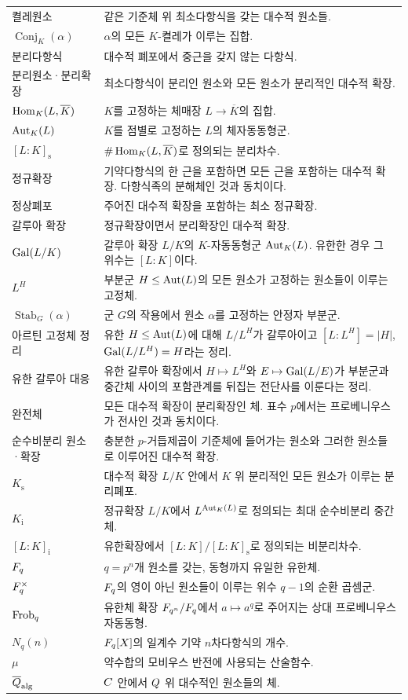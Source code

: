 \begin{longtable}{>{\raggedright\arraybackslash}p{}>{\raggedright\arraybackslash}p{}}
켤레원소 & 같은 기준체 위 최소다항식을 갖는 대수적 원소들. \\
$\operatorname{Conj}_K(\alpha)$ & $\alpha$의 모든 $K$-켤레가 이루는 집합. \\
분리다항식 & 대수적 폐포에서 중근을 갖지 않는 다항식. \\
분리원소·분리확장 & 최소다항식이 분리인 원소와 모든 원소가 분리적인 대수적 확장. \\
$\operatorname{Hom}_K(L,\overline K)$ & $K$를 고정하는 체매장 $L\to\overline K$의 집합. \\
$\operatorname{Aut}_K(L)$ & $K$를 점별로 고정하는 $L$의 체자동동형군. \\
$[L:K]_{\mathrm s}$ & $\#\operatorname{Hom}_K(L,\overline K)$로 정의되는 분리차수. \\
정규확장 & 기약다항식의 한 근을 포함하면 모든 근을 포함하는 대수적 확장. 다항식족의 분해체인 것과 동치이다. \\
정상폐포 & 주어진 대수적 확장을 포함하는 최소 정규확장. \\
갈루아 확장 & 정규확장이면서 분리확장인 대수적 확장. \\
$\operatorname{Gal}(L/K)$ & 갈루아 확장 $L/K$의 $K$-자동동형군 $\operatorname{Aut}_K(L)$. 유한한 경우 그 위수는 $[L:K]$이다. \\
$L^H$ & 부분군 $H\le\operatorname{Aut}(L)$의 모든 원소가 고정하는 원소들이 이루는 고정체. \\
$\operatorname{Stab}_G(\alpha)$ & 군 $G$의 작용에서 원소 $\alpha$를 고정하는 안정자 부분군. \\
아르틴 고정체 정리 & 유한 $H\le\operatorname{Aut}(L)$에 대해 $L/L^H$가 갈루아이고 $[L:L^H]=|H|$, $\operatorname{Gal}(L/L^H)=H$라는 정리. \\
유한 갈루아 대응 & 유한 갈루아 확장에서 $H\mapsto L^H$와 $E\mapsto\operatorname{Gal}(L/E)$가 부분군과 중간체 사이의 포함관계를 뒤집는 전단사를 이룬다는 정리. \\
완전체 & 모든 대수적 확장이 분리확장인 체. 표수 $p$에서는 프로베니우스가 전사인 것과 동치이다. \\
순수비분리 원소·확장 & 충분한 $p$-거듭제곱이 기준체에 들어가는 원소와 그러한 원소들로 이루어진 대수적 확장. \\
$K_{\mathrm s}$ & 대수적 확장 $L/K$ 안에서 $K$ 위 분리적인 모든 원소가 이루는 분리폐포. \\
$K_{\mathrm i}$ & 정규확장 $L/K$에서 $L^{\operatorname{Aut}_K(L)}$로 정의되는 최대 순수비분리 중간체. \\
$[L:K]_{\mathrm i}$ & 유한확장에서 $[L:K]/[L:K]_{\mathrm s}$로 정의되는 비분리차수. \\
$F_q$ & $q=p^n$개 원소를 갖는, 동형까지 유일한 유한체. \\
$F_q^\times$ & $F_q$의 영이 아닌 원소들이 이루는 위수 $q-1$의 순환 곱셈군. \\
$\operatorname{Frob}_q$ & 유한체 확장 $F_{q^n}/F_q$에서 $a\mapsto a^q$로 주어지는 상대 프로베니우스 자동동형. \\
$N_q(n)$ & $F_q[X]$의 일계수 기약 $n$차다항식의 개수. \\
$\mu$ & 약수합의 모비우스 반전에 사용되는 산술함수. \\
$\overline{Q}_{\mathrm{alg}}$ & $C$ 안에서 $Q$ 위 대수적인 원소들의 체. \\

\end{longtable}
